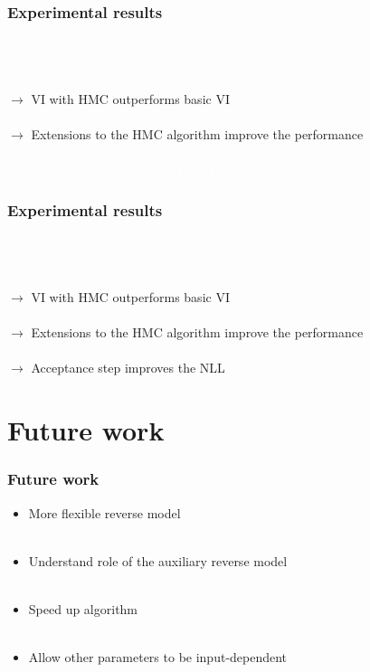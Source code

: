 \documentclass{beamer}
\begin{document}
	\begin{frame}[noframenumbering]
		\frametitle{Experimental results}
		\centering
		\resizebox{\columnwidth}{!}{}
		\raggedright
		\\~\\~\\
		$\boldsymbol{\rightarrow}$ VI with HMC outperforms basic VI \\~\\
		$\boldsymbol{\rightarrow}$ Extensions to the HMC algorithm improve the performance \\~\\
		\textcolor{white}{$\boldsymbol{\rightarrow}$ Acceptance step improves the NLL}
	\end{frame}
	
	\begin{frame}[noframenumbering]
		\frametitle{Experimental results}
		\centering
		\resizebox{\columnwidth}{!}{}
		\raggedright
		\\~\\~\\
		$\boldsymbol{\rightarrow}$ VI with HMC outperforms basic VI \\~\\
		$\boldsymbol{\rightarrow}$ Extensions to the HMC algorithm improve the performance \\~\\
		$\boldsymbol{\rightarrow}$ Acceptance step improves the NLL
	\end{frame}
			
\section{Future work}
\begin{frame}
	\frametitle{Future work}
	\begin{itemize}
	\item More flexible reverse model \\~\\
	\item Understand role of the auxiliary reverse model \\~\\
	\item Speed up algorithm \\~\\
	\item Allow other parameters to be input-dependent
	\end{itemize}
\end{frame}
	
\end{document}
